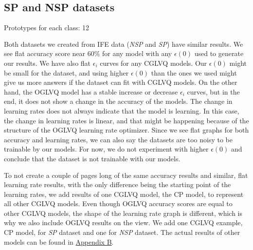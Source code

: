 \subsection{SP and NSP datasets}

Prototypes for each class: 12
\vspace{5pt}


Both datasets we created from IFE data (\textit{NSP} and \textit{SP}) have similar results. We see flat accuracy score near 60\% for any model with any $\epsilon(0)$ used to generate our results. We have also flat $\epsilon_{i}$ curves for any CGLVQ models. Our $\epsilon(0)$ might be small for the dataset, and using higher $\epsilon(0)$ than the ones we used might give us more answers if the dataset can fit with CGLVQ models. On the other hand, the OGLVQ model has a stable increase or decrease $\epsilon_{i}$ curves, but in the end, it does not show a change in the accuracy of the models. The change in learning rates does not always indicate that the model is learning. In this case, the change in learning rates is linear, and that might be happening because of the structure of the OGLVQ learning rate optimizer. Since we see flat graphs for both accuracy and learning rates, we can also say the datasets are too noisy to be trainable by our models. For now, we do not experiment with higher $\epsilon(0)$ and conclude that the dataset is not trainable with our models.

To not create a couple of pages long of the same accuracy results and similar, flat learning rate results, with the only difference being the starting point of the learning rates, we add results of one CGLVQ model, the CP model, to represent all other CGLVQ models. Even though OGLVQ accuracy scores are equal to other CGLVQ models, the shape of the learning rate graph is different, which is why we also include OGLVQ results on the view. We add one CGLVQ example, CP model, for \textit{SP} dataset and one for \textit{NSP} dataset. The actual results of other models can be found in \hyperlink{appspnsp}{Appendix B}.


